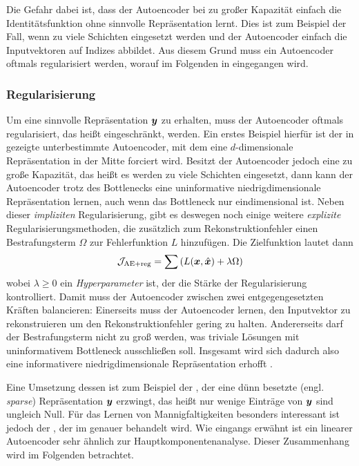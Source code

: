 Die Gefahr dabei ist, dass der Autoencoder bei zu großer Kapazität einfach die Identitätsfunktion
ohne sinnvolle Repräsentation lernt. Dies ist zum Beispiel der Fall, wenn zu viele Schichten
eingesetzt werden und der Autoencoder einfach die Inputvektoren auf Indizes abbildet. Aus diesem
Grund muss ein Autoencoder oftmals regularisiert werden, worauf im Folgenden in
 eingegangen wird.

\subsubsection{Regularisierung}
\label{ch:MethodenDerDimRed:ML:AE:Regularisierung}
Um eine sinnvolle Repräsentation $\bm{y}$ zu erhalten, muss der Autoencoder oftmals
regularisiert, das heißt eingeschränkt, werden. Ein erstes Beispiel hierfür ist der in
 gezeigte unterbestimmte Autoencoder, mit dem eine $d$-dimensionale
Repräsentation in der Mitte forciert wird. Besitzt der Autoencoder jedoch eine zu große Kapazität,
das heißt es werden zu viele Schichten eingesetzt, dann kann der Autoencoder trotz des Bottlenecks
eine uninformative niedrigdimensionale Repräsentation lernen, auch wenn das Bottleneck nur
eindimensional ist. Neben dieser \textit{impliziten} Regularisierung, gibt es deswegen noch einige
weitere \textit{explizite} Regularisierungsmethoden, die zusätzlich zum Rekonstruktionfehler einen
Bestrafungsterm $\Omega$ zur Fehlerfunktion $L$ hinzufügen. Die Zielfunktion lautet dann
\begin{equation}
	\mathcal{J}_{\text{AE+reg}} = \sum \left( L(\bm{x}, \hat{\bm{x}}) + \lambda \Omega \right)
\end{equation}
wobei $\lambda \geq 0$ ein \textit{Hyperparameter} ist, der die Stärke der Regularisierung kontrolliert. Damit muss der Autoencoder zwischen zwei entgegengesetzten Kräften balancieren: Einerseits muss der Autoencoder lernen, den Inputvektor zu rekonstruieren um den Rekonstruktionfehler gering zu halten. Andererseits darf der Bestrafungsterm nicht zu groß werden, was triviale Lösungen mit uninformativem Bottleneck ausschließen soll. Insgesamt wird sich dadurch also eine informativere niedrigdimensionale Repräsentation erhofft \parencite[516]{Goodfellow.2016}.

Eine Umsetzung dessen ist zum Beispiel der , der eine dünn besetzte
(engl. \textit{sparse}) Repräsentation $\bm{y}$ erzwingt, das heißt nur wenige Einträge von
$\bm{y}$ sind ungleich Null. Für das Lernen von Mannigfaltigkeiten besonders interessant ist
jedoch der  \parencite{Rifai.2011}, der im  genauer behandelt wird. Wie
eingangs erwähnt ist ein linearer Autoencoder sehr ähnlich zur Hauptkomponentenanalyse. Dieser
Zusammenhang wird im Folgenden betrachtet.

